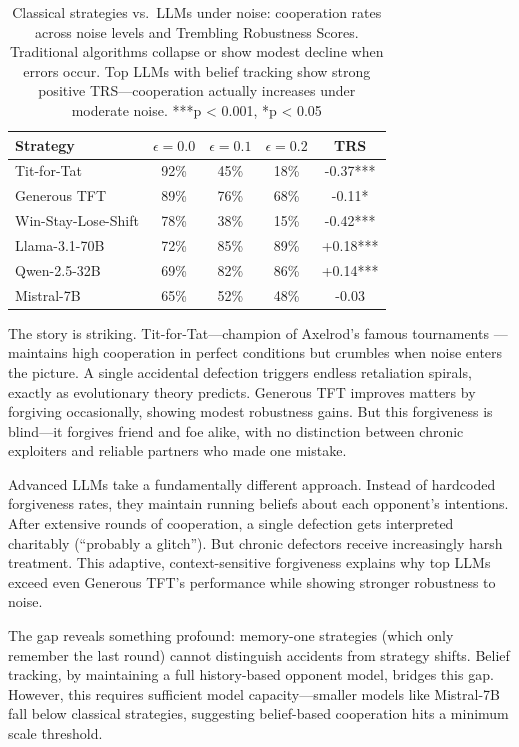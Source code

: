 \documentclass{uai2026} %
\begin{document}
\begin{table}[h]
\centering
\begin{tabular}{lcccc}
\toprule
\textbf{Strategy} & \textbf{$\epsilon=0.0$} & \textbf{$\epsilon=0.1$} & \textbf{$\epsilon=0.2$} & \textbf{TRS} \\
\midrule
Tit-for-Tat & 92\% & 45\% & 18\% & -0.37*** \\
Generous TFT & 89\% & 76\% & 68\% & -0.11* \\
Win-Stay-Lose-Shift & 78\% & 38\% & 15\% & -0.42*** \\
\midrule
Llama-3.1-70B & 72\% & 85\% & 89\% & +0.18*** \\
Qwen-2.5-32B & 69\% & 82\% & 86\% & +0.14*** \\
Mistral-7B & 65\% & 52\% & 48\% & -0.03 \\
\bottomrule
\end{tabular}
\caption{Classical strategies vs.~LLMs under noise: cooperation rates across noise levels and Trembling Robustness Scores. Traditional algorithms collapse or show modest decline when errors occur. Top LLMs with belief tracking show strong positive TRS---cooperation actually increases under moderate noise. ***p < 0.001, *p < 0.05}
\label{tab:baselines}
\end{table}

The story is striking. Tit-for-Tat---champion of Axelrod's famous tournaments \citep{axelrod1981evolution}---maintains high cooperation in perfect conditions but crumbles when noise enters the picture. A single accidental defection triggers endless retaliation spirals, exactly as evolutionary theory predicts. Generous TFT improves matters by forgiving occasionally, showing modest robustness gains. But this forgiveness is blind---it forgives friend and foe alike, with no distinction between chronic exploiters and reliable partners who made one mistake.

Advanced LLMs take a fundamentally different approach. Instead of hardcoded forgiveness rates, they maintain running beliefs about each opponent's intentions. After extensive rounds of cooperation, a single defection gets interpreted charitably (``probably a glitch''). But chronic defectors receive increasingly harsh treatment. This adaptive, context-sensitive forgiveness explains why top LLMs exceed even Generous TFT's performance while showing stronger robustness to noise.

The gap reveals something profound: memory-one strategies (which only remember the last round) cannot distinguish accidents from strategy shifts. Belief tracking, by maintaining a full history-based opponent model, bridges this gap. However, this requires sufficient model capacity---smaller models like Mistral-7B fall below classical strategies, suggesting belief-based cooperation hits a minimum scale threshold.
\end{document}
